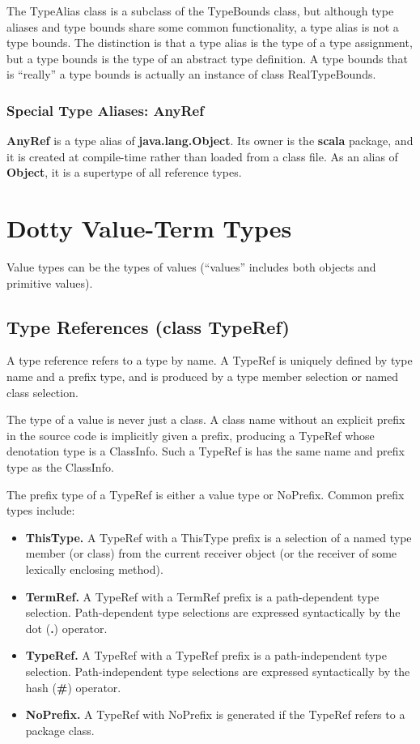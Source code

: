 \documentclass[11pt]{report}
\newcommand{\cdf}{\bf\ttfamily} %
\newcommand{\cd}{\cdf\small}  %
\begin{document}
The TypeAlias class is a subclass of the TypeBounds class, but although type aliases and type bounds share some common functionality, a type alias is not a type bounds. The distinction is that a type alias is the type of a type assignment, but a type bounds is the type of an abstract type definition. A type bounds that is ``really'' a type bounds is actually an instance of class RealTypeBounds.

\subsubsection{Special Type Aliases: AnyRef}

{\cd AnyRef} is a type alias of {\cd java.lang.Object}. Its owner is the {\cd scala} package, and it is created at compile-time rather than loaded from a class file. As an alias of {\cd Object}, it is a supertype of all reference types.


\section{Dotty Value-Term Types} \label{sec:value-types}

Value types can be the types of values (``values'' includes both objects and primitive values).

\subsection{Type References (class TypeRef)}

A type reference refers to a type by name.
A TypeRef is uniquely defined by type name and a prefix type, and is produced by a type member selection or named class selection.

The type of a value is never just a class. A class name without an explicit prefix in the source code is implicitly given a prefix, producing a TypeRef whose denotation type is a ClassInfo. Such a TypeRef is has the same name and prefix type as the ClassInfo.

The prefix type of a TypeRef is either a value type or NoPrefix. Common prefix types include:
\begin{itemize}
\item {\bf ThisType.} A TypeRef with a ThisType prefix is a selection of a named type member (or class) from the current receiver object (or the receiver of some lexically enclosing method).
\item {\bf TermRef.} A TypeRef with a TermRef prefix is a path-dependent type selection. Path-dependent type selections are expressed syntactically by the dot ({\cd .}) operator.
\item {\bf TypeRef.} A TypeRef with a TypeRef prefix is a path-independent type selection. Path-independent type selections are expressed syntactically by the hash ({\cd \#}) operator.
\item {\bf NoPrefix.} A TypeRef with NoPrefix is generated if the TypeRef refers to a package class.
\end{itemize}
\end{document}
